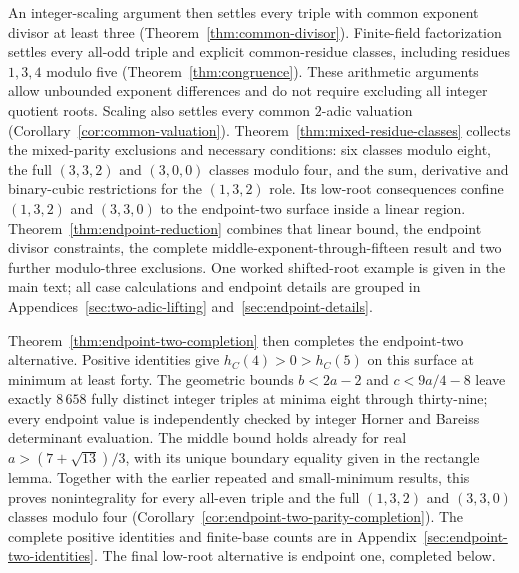 An integer-scaling argument then settles every triple with common
exponent divisor at least three (Theorem~\ref{thm:common-divisor}).
Finite-field factorization settles every all-odd triple and explicit
common-residue classes, including residues $1,3,4$ modulo five
(Theorem~\ref{thm:congruence}). These arithmetic arguments allow
unbounded exponent differences and do not require excluding all integer
quotient roots.
Scaling also settles every common $2$-adic valuation
(Corollary~\ref{cor:common-valuation}).
Theorem~\ref{thm:mixed-residue-classes} collects the mixed-parity exclusions
and necessary conditions: six classes modulo eight, the full $(3,3,2)$
and $(3,0,0)$ classes modulo four, and the sum, derivative and binary-cubic
restrictions for the $(1,3,2)$ role. Its low-root consequences confine
$(1,3,2)$ and $(3,3,0)$ to the endpoint-two surface inside a linear region.
Theorem~\ref{thm:endpoint-reduction} combines that linear bound, the endpoint
divisor constraints, the complete middle-exponent-through-fifteen result
and two further modulo-three exclusions. One worked shifted-root example
is given in the main text; all case calculations and endpoint details are
grouped in Appendices~\ref{sec:two-adic-lifting} and~\ref{sec:endpoint-details}.

Theorem~\ref{thm:endpoint-two-completion} then completes the endpoint-two
alternative. Positive identities give $h_C(4)>0>h_C(5)$ on this surface
at minimum at least forty. The geometric bounds
$b<2a-2$ and $c<9a/4-8$ leave exactly $8\,658$ fully distinct integer
triples at minima eight through thirty-nine; every endpoint value is
independently checked by integer Horner and Bareiss determinant evaluation.
The middle bound holds already for real $a>(7+\sqrt{13})/3$,
with its unique boundary equality given in the rectangle lemma.
Together with the earlier repeated and small-minimum results, this proves
nonintegrality for every all-even triple and the full $(1,3,2)$ and
$(3,3,0)$ classes modulo four
(Corollary~\ref{cor:endpoint-two-parity-completion}). The complete positive
identities and finite-base counts are in
Appendix~\ref{sec:endpoint-two-identities}. The final low-root alternative is endpoint one, completed below.

